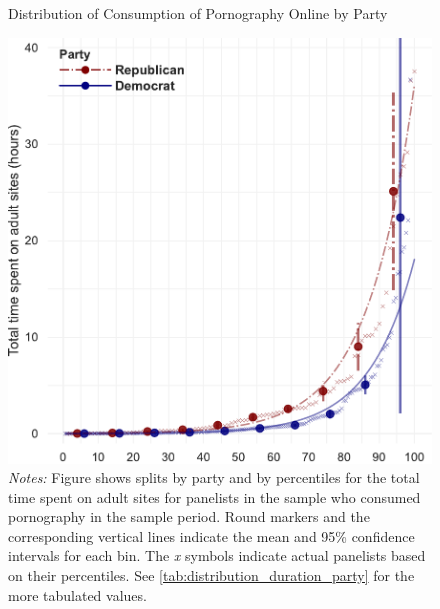 \documentclass[12pt, letterpaper]{article}
\begin{document}
\begin{figure}[ht]
	\centering
	\caption{Distribution of Consumption of Pornography Online by Party}
	\includegraphics[width=.6\linewidth]{../figs/distribution_duration_on_adultsites_by_party.pdf}
	\caption*{\footnotesize \emph{Notes:} 
		Figure shows splits by party and by percentiles for the total time spent on adult sites for panelists in the sample who consumed pornography in the sample period.
		Round markers and the corresponding vertical lines indicate the mean and 95\% confidence intervals for each bin.
		The \emph{x} symbols indicate actual panelists based on their percentiles.
		See \cref{tab:distribution_duration_party} for the more tabulated values.
	}
	\label{fig:distribution_duration_party}
\end{figure}
\end{document}
